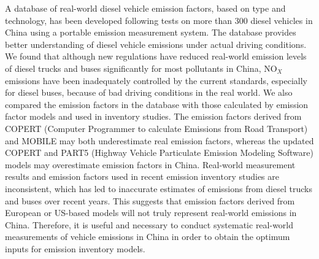 A database of real-world diesel vehicle emission factors, based on type and technology, has been developed following tests on more than 300 diesel vehicles in China using a portable emission measurement system. The database provides better understanding of diesel vehicle emissions under actual driving conditions. We found that although new regulations have reduced real-world emission levels of diesel trucks and buses significantly for most pollutants in China, NO$_X$ emissions have been inadequately controlled by the current standards, especially for diesel buses, because of bad driving conditions in the real world. We also compared the emission factors in the database with those calculated by emission factor models and used in inventory studies. The emission factors derived from COPERT (Computer Programmer to calculate Emissions from Road Transport) and MOBILE may both underestimate real emission factors, whereas the updated COPERT and PART5 (Highway Vehicle Particulate Emission Modeling Software) models may overestimate emission factors in China. Real-world measurement results and emission factors used in recent emission inventory studies are inconsistent, which has led to inaccurate estimates of emissions from diesel trucks and buses over recent years. This suggests that emission factors derived from European or US-based models will not truly represent real-world emissions in China. Therefore, it is useful and necessary to conduct systematic real-world measurements of vehicle emissions in China in order to obtain the optimum inputs for emission inventory models.
